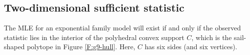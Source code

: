 



\subsection{Two-dimensional sufficient statistic}\label{S:example 2dim}
The MLE for an exponential family model will exist if and only if the observed 
statistic lies in the interior of the polyhedral convex support $C$, which is the sail-shaped polytope in Figure \ref{F:g9-hull}. Here, $C$ has six sides (and six vertices).


